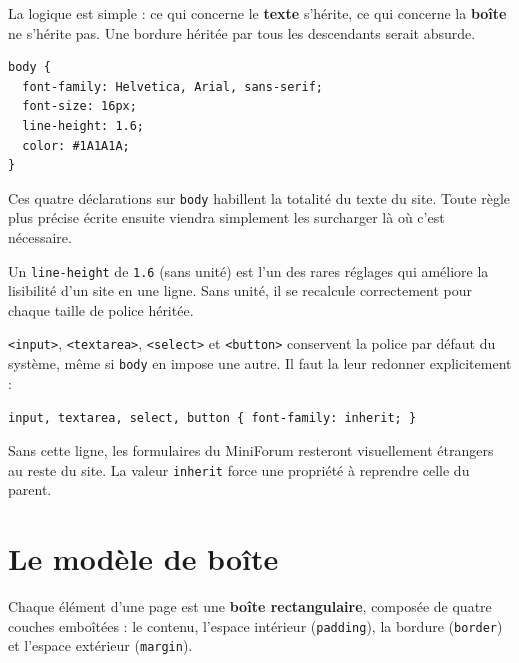 \documentclass[a4paper,11pt]{article}
\begin{document}
\medskip
La logique est simple : ce qui concerne le \textbf{texte} s'hérite, ce qui concerne la \textbf{boîte} ne s'hérite pas. Une bordure héritée par tous les descendants serait absurde.

\begin{lstlisting}[language=CSS3, caption={Poser la typographie une seule fois}]
body {
  font-family: Helvetica, Arial, sans-serif;
  font-size: 16px;
  line-height: 1.6;
  color: #1A1A1A;
}
\end{lstlisting}

\begin{tcolorbox}[astuce, title={Le réglage le plus rentable de la semaine}]
Ces quatre déclarations sur \texttt{body} habillent la totalité du texte du site. Toute règle plus précise écrite ensuite viendra simplement les surcharger là où c'est nécessaire.

\vspace{3pt}
Un \texttt{line-height} de \texttt{1.6} (sans unité) est l'un des rares réglages qui améliore la lisibilité d'un site en une ligne. Sans unité, il se recalcule correctement pour chaque taille de police héritée.
\end{tcolorbox}

\begin{tcolorbox}[attention, title={Les champs de formulaire n'héritent pas de la police}]
\texttt{<input>}, \texttt{<textarea>}, \texttt{<select>} et \texttt{<button>} conservent la police par défaut du système, même si \texttt{body} en impose une autre. Il faut la leur redonner explicitement :

\vspace{3pt}
\texttt{\small input, textarea, select, button \{ font-family: inherit; \}}

\vspace{3pt}
Sans cette ligne, les formulaires du MiniForum resteront visuellement étrangers au reste du site. La valeur \texttt{inherit} force une propriété à reprendre celle du parent.
\end{tcolorbox}

\newpage

\section{Le modèle de boîte}

\begin{tcolorbox}[definition, title={Définition --- Modèle de boîte}]
Chaque élément d'une page est une \textbf{boîte rectangulaire}, composée de quatre couches emboîtées : le contenu, l'espace intérieur (\texttt{padding}), la bordure (\texttt{border}) et l'espace extérieur (\texttt{margin}).
\end{tcolorbox}
\end{document}
